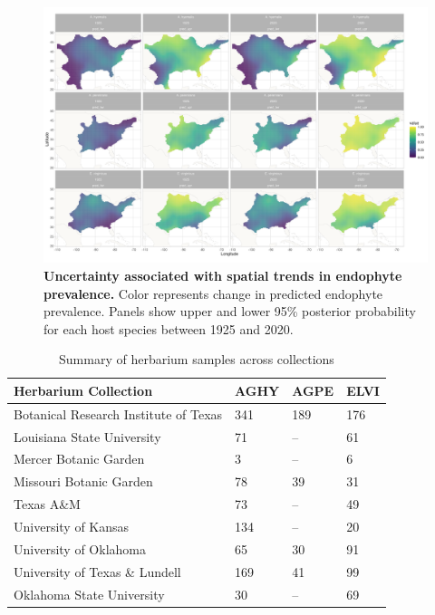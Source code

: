 \documentclass[11pt]{article}
\begin{document}
\begin{figure}[H]
	\centering
	\includegraphics[width = \linewidth]{prevalence_map_CI.png}
	\caption{\textbf{Uncertainty associated with spatial trends in endophyte prevalence.} Color represents change in predicted endophyte prevalence. Panels show upper and lower 95\% posterior probability for each host species between 1925 and 2020.}
\end{figure}

	
	\begin{table}[h]
		\caption{Summary of herbarium samples across collections}
		\label{Table:herbaria}
		\centering
		\begin{tabular}{llll}\hline
			Herbarium Collection        & AGHY        & AGPE      &      ELVI\\ \hline
			Botanical Research Institute of Texas &   341   &    189&    176    \\
			Louisiana State University &     71  & --  &   61       \\
			Mercer Botanic Garden &   3    & --     &     6\\
			Missouri Botanic Garden& 78 & 39& 31\\
		    Texas A\&M &  73&-- & 49 \\
		    University of Kansas & 134 & -- &  20\\
		    University of Oklahoma & 65 &30&  91\\
		    University of Texas  \& Lundell   &  169& 41& 99\\		    				 			     			     
			Oklahoma State University&     30  &   --    &  69 \\ \hline
		\end{tabular}
		\bigskip{}

	\end{table}
	
\end{document}
